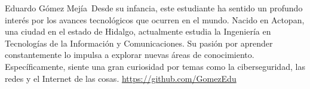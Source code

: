 \documentclass{IEEEcsmag}
\begin{document}
\begin{IEEEbiography}{Eduardo Gómez Mejía}{\,}
    Desde su infancia, este estudiante ha sentido un profundo interés por los avances tecnológicos que ocurren en el mundo. Nacido en Actopan, una ciudad en el estado de Hidalgo, actualmente estudia la Ingeniería en Tecnologías de la Información y Comunicaciones. Su pasión por aprender constantemente lo impulsa a explorar nuevas áreas de conocimiento. Específicamente, siente una gran curiosidad por temas como la ciberseguridad, las redes y el Internet de las cosas. \url{https://github.com/GomezEdu}
\end{IEEEbiography}
\end{document}

